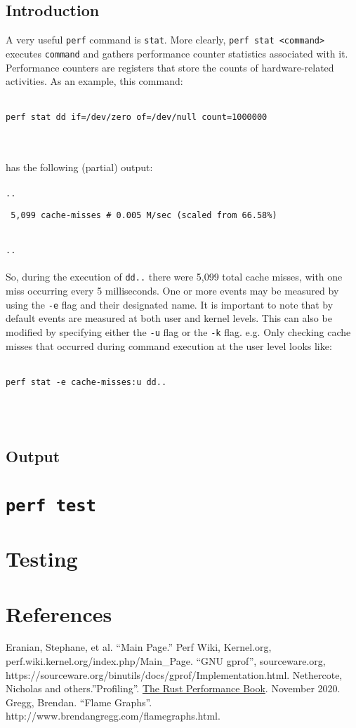 \documentclass{article}
\begin{document}
\subsection{Introduction}
A very useful \verb|perf| command is \verb|stat|. More clearly, \texttt{perf stat <command>} executes \texttt{command} and gathers performance counter statistics associated with it. Performance counters are registers that store the counts of hardware-related activities. As an example, this command:
\\\\
\centerline{\texttt{perf stat dd if=/dev/zero of=/dev/null count=1000000}}
\\\\
has the following (partial) output:
\\\\
\texttt{..}\\
\centerline{\texttt{ 5,099 cache-misses \hspace{5mm} \# \hspace{5mm} 0.005 M/sec (scaled from 66.58\%)}}\\
\texttt{..}
\\\\
So, during the execution of \verb|dd..| there were 5,099 total cache misses, with one miss occurring every 5 milliseconds.
One or more events may be measured by using the \texttt{-e} flag and their designated name. It is important to note that by default events are measured at both user and kernel levels. This can also be modified by specifying either the \texttt{-u} flag or the \texttt{-k} flag. e.g. Only checking cache misses that occurred during command execution at the user level looks like:
\\\\
\centerline{\texttt{perf stat -e cache-misses:u dd..}}
\\\\
\subsection{Output}
\section{\texttt{perf test}}
\section{Testing}
\pagebreak
\section{References}
Eranian, Stephane, et al. “Main Page.” Perf Wiki, Kernel.org,
\\perf.wiki.kernel.org/index.php/Main\_Page.
``GNU gprof'', sourceware.org,
https://sourceware.org/binutils/docs/gprof/Implementation.html.
Nethercote, Nicholas and others.''Profiling''. \underline{The Rust Performance Book}. November 2020.
Gregg, Brendan. ``Flame Graphs''. http://www.brendangregg.com/flamegraphs.html.
\end{document}
